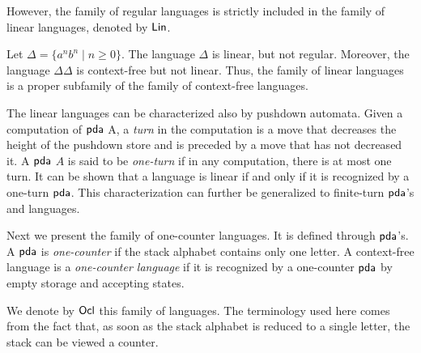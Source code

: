 However, the family of regular languages is strictly included in the family of linear languages, denoted by \index{$\Lin$}$\Lin$.

Let $\Delta = \{a^n b^n \mid n \ge 0\}$. The language $\Delta$ is linear, but not regular. Moreover, the language $\Delta \Delta$ is context-free but not linear. Thus, the family of linear languages is a proper subfamily of the family of context-free languages. 
%

The linear languages can be characterized also by pushdown automata. Given a computation of \index{$\pda$}$\pda$ A, a \emph{turn} in the computation is a move that decreases the height of the pushdown store and is preceded by a move that has not decreased it. A \index{$\pda$}$\pda$ $A$ is said to be  \emph{one-turn} if in any computation, there is at most one turn. It can be shown that a language is linear if and only if it is recognized by a one-turn $\pda$. This characterization can further be generalized to  finite-turn \index{$\pda$}$\pda$'s and languages.

Next we present the family of one-counter languages. It is defined through \index{$\pda$}$\pda$'s. A \index{$\pda$}$\pda$ is \emph{one-counter} if the stack alphabet contains only one letter. A context-free language is a \emph{one-counter language} if it is recognized by a one-counter \index{$\pda$}$\pda$ by empty storage and accepting states.

We denote by \index{$\Ocl$}$\Ocl$ this family of languages. The terminology used here comes from the fact that, as soon as the stack alphabet is reduced to a single letter, the stack can be viewed a counter.

